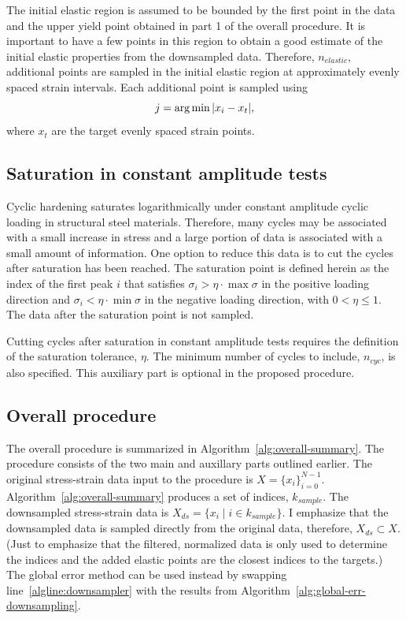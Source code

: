\documentclass[a4paper,11pt]{article}
\begin{document}
The initial elastic region is assumed to be bounded by the first point in the data and the upper yield point obtained in part 1 of the overall procedure.
It is important to have a few points in this region to obtain a good estimate of the initial elastic properties from the downsampled data.
Therefore, $n_{elastic}$, additional points are sampled in the initial elastic region at approximately evenly spaced strain intervals.
Each additional point is sampled using
\begin{equation}
    j = \arg \min \abs{x_i - x_{t}},
\end{equation}
where $x_t$ are the target evenly spaced strain points.

\subsection{Saturation in constant amplitude tests}

Cyclic hardening saturates logarithmically under constant amplitude cyclic loading in structural steel materials.
Therefore, many cycles may be associated with a small increase in stress and a large portion of data is associated with a small amount of information.
One option to reduce this data is to cut the cycles after saturation has been reached.
The saturation point is defined herein as the index of the first peak $i$ that satisfies $\sigma_i > \eta \cdot \max \sigma$ in the positive loading direction and $\sigma_i < \eta \cdot \min \sigma$ in the negative loading direction, with $0 < \eta \leq 1$.
The data after the saturation point is not sampled.

Cutting cycles after saturation in constant amplitude tests requires the definition of the saturation tolerance, $\eta$.
The minimum number of cycles to include, $n_{cyc}$, is also specified.
This auxiliary part is optional in the proposed procedure.


\subsection{Overall procedure}
\label{sec:overall-procedure}

The overall procedure is summarized in Algorithm~\ref{alg:overall-summary}.
The procedure consists of the two main and auxillary parts outlined earlier.
The original stress-strain data input to the procedure is $X = \{x_i \}_{i=0}^{N-1}$.
Algorithm~\ref{alg:overall-summary} produces a set of indices, $k_{sample}$.
The downsampled stress-strain data is $X_{ds} = \{ x_i \mid i \in k_{sample} \}$.
I emphasize that the downsampled data is sampled directly from the original data, therefore, $X_{ds} \subset X$.
(Just to emphasize that the filtered, normalized data is only used to determine the indices and the added elastic points are the closest indices to the targets.)
The global error method can be used instead by swapping line~\ref{algline:downsampler} with the results from Algorithm~\ref{alg:global-err-downsampling}.
\end{document}
